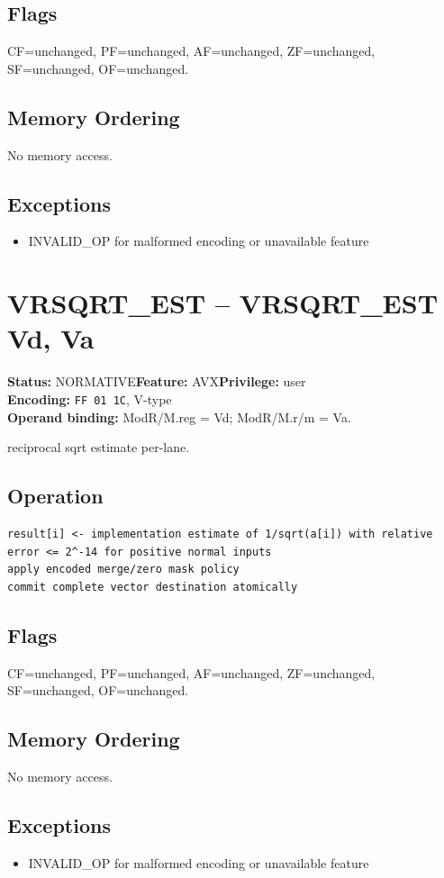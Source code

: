 \documentclass[10pt]{article}
\begin{document}
\subsection*{Flags}
CF=unchanged, PF=unchanged, AF=unchanged, ZF=unchanged, SF=unchanged, OF=unchanged.
\subsection*{Memory Ordering}
No memory access.
\subsection*{Exceptions}
\begin{itemize}
\item INVALID\_OP for malformed encoding or unavailable feature
\end{itemize}
\clearpage

\section{VRSQRT\_EST -- VRSQRT\_EST Vd, Va}
\textbf{Status:} NORMATIVE\quad \textbf{Feature:} AVX\quad \textbf{Privilege:} user\\
\textbf{Encoding:} \texttt{FF 01 1C}, V-type\\
\textbf{Operand binding:} ModR/M.reg = Vd; ModR/M.r/m = Va.

reciprocal sqrt estimate per-lane.

\subsection*{Operation}
\begin{lstlisting}
result[i] <- implementation estimate of 1/sqrt(a[i]) with relative error <= 2^-14 for positive normal inputs
apply encoded merge/zero mask policy
commit complete vector destination atomically
\end{lstlisting}
\subsection*{Flags}
CF=unchanged, PF=unchanged, AF=unchanged, ZF=unchanged, SF=unchanged, OF=unchanged.
\subsection*{Memory Ordering}
No memory access.
\subsection*{Exceptions}
\begin{itemize}
\item INVALID\_OP for malformed encoding or unavailable feature
\end{itemize}
\clearpage
\end{document}
